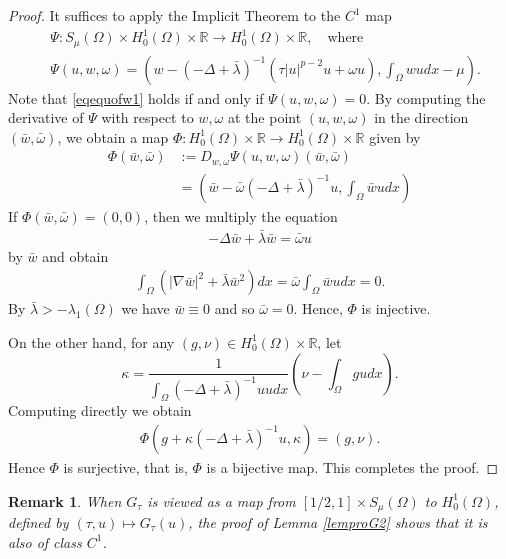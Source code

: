 \documentclass[10pt,a4paper]{article}
\newtheorem{remark}[theorem]{Remark}
\theoremstyle{definition} \theoremstyle{remark}
\numberwithin{equation}{section}
\newcommand{\R}{\mathbb{R}}
\newcommand{\la}{\lambda}
\begin{document}
\begin{proof}
	It suffices to apply the Implicit Theorem to the $C^1$ map
	\begin{align*}
		& \Psi : S_\mu(\Omega) \times H_0^1(\Omega) \times \R \to H_0^1(\Omega) \times \R, \quad \text{where} \\
		& \Psi(u,w,\omega) = \left( w - (-\Delta + \bar\la)^{-1}(\tau|u|^{p-2}u + \omega u), \int_\Omega wu dx - \mu \right).
	\end{align*}
    Note that \eqref{eqequofw1} holds if and only if $\Psi(u,w,\omega) = 0$. By computing the derivative of $\Psi$ with respect to $w,\omega$ at the point $(u,w,\omega)$ in the direction $(\bar w, \bar \omega)$, we obtain a map $\Phi : H_0^1(\Omega) \times \R \to H_0^1(\Omega) \times \R$ given by
    \begin{align*}
    	\Phi(\bar w, \bar \omega) & := D_{w,\omega}\Psi(u,w,\omega)(\bar w, \bar \omega) \\
    	& = \left(\bar w - \bar\omega (-\Delta + \bar\la)^{-1}u, \int_\Omega \bar wu dx \right)
    \end{align*}
    If $\Phi(\bar w, \bar \omega)= (0,0)$, then we multiply the equation
    \begin{align*}
    	-\Delta \bar w + \bar\la \bar w = \bar \omega u
    \end{align*}
    by $\bar w$ and obtain
    \begin{align*}
    	\int_\Omega \left( |\nabla \bar w|^2 + \bar\la \bar w ^2\right) dx = \bar \omega\int_\Omega \bar wu dx = 0.
    \end{align*}
    By $\bar \la > -\la_1(\Omega)$ we have $\bar w \equiv 0$ and so $\bar \omega = 0$. Hence, $\Phi$ is injective.

    On the other hand, for any $(g,\nu) \in H_0^1(\Omega) \times \R$, let $$\kappa = \frac{1}{\int_\Omega(-\Delta + \bar \la)^{-1}u u dx}\left( \nu -\int_\Omega gu dx\right) .$$
    Computing directly we obtain
    \begin{align*}
    	\Phi(g+\kappa (-\Delta + \bar \la)^{-1}u,\kappa) = (g,\nu).
    \end{align*}
    Hence $\Phi$ is surjective, that is, $\Phi$ is a bijective map. This completes the proof.
\end{proof}

\begin{remark}
	When $G_\tau$ is viewed as a map from $[1/2,1] \times S_\mu(\Omega)$ to $H_0^1(\Omega)$, defined by $(\tau,u) \mapsto G_\tau(u)$, the proof of Lemma \ref{lemproG2} shows that it is also of class $C^1$.
\end{remark}
\end{document}
